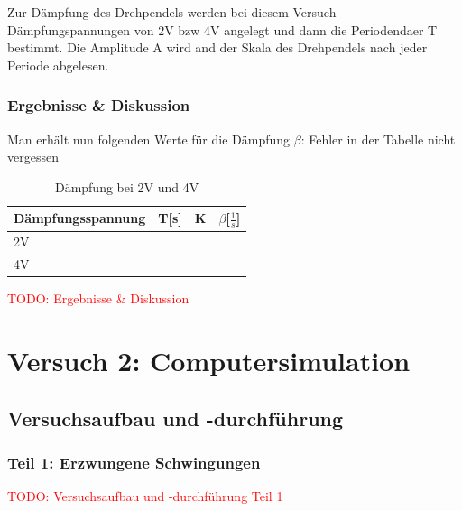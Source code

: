         Zur Dämpfung des Drehpendels werden bei diesem Versuch Dämpfungspannungen von 2V bzw 4V
        angelegt und dann die Periodendaer T bestimmt. Die Amplitude A wird and der Skala des Drehpendels nach jeder Periode abgelesen.

    \subsubsection{Ergebnisse \& Diskussion}
        Man erhält nun folgenden Werte für die Dämpfung $\beta$:
        Fehler in der Tabelle nicht vergessen
        \begin{table}[H]
            \centering
            \label{tab:Dämpfung bei 2V und 4V}
            \caption{Dämpfung bei 2V und 4V}
            \begin{tabular}{|l|l|l|l|}
                \hline
                Dämpfungsspannung & T[s] & K & $\beta$[$\frac{1}{s}$]\\
                \hline
                2V & & & \\
                \hline
                4V & & & \\
                \hline
            \end{tabular}
        \end{table}  
        \textcolor{red}{TODO: Ergebnisse \& Diskussion}

\newpage

\section{Versuch 2: Computersimulation}

    \subsection{Versuchsaufbau und -durchführung}

        \subsubsection{Teil 1: Erzwungene Schwingungen}
            
            \textcolor{red}{TODO: Versuchsaufbau und -durchführung Teil 1}

